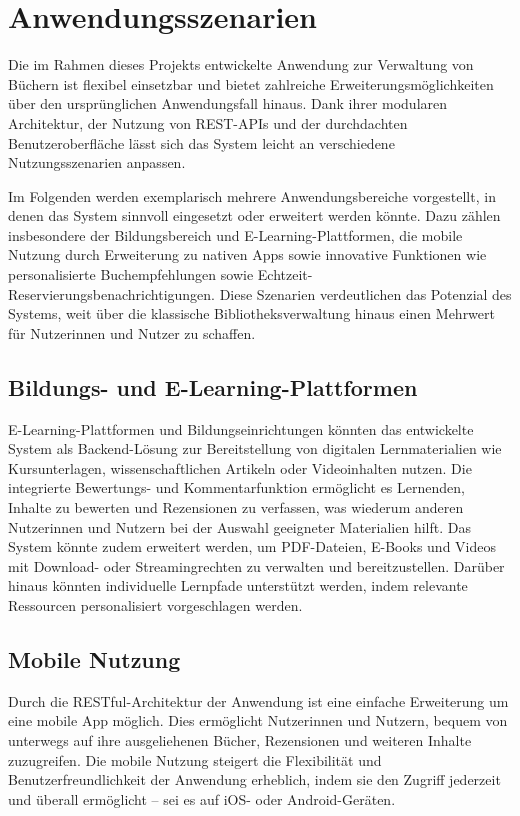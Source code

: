 \chapter{Anwendungsszenarien}

Die im Rahmen dieses Projekts entwickelte Anwendung zur Verwaltung von Büchern ist flexibel einsetzbar und bietet zahlreiche Erweiterungsmöglichkeiten über den ursprünglichen Anwendungsfall hinaus. Dank ihrer modularen Architektur, der Nutzung von REST-APIs und der durchdachten Benutzeroberfläche lässt sich das System leicht an verschiedene Nutzungsszenarien anpassen.

\noindent Im Folgenden werden exemplarisch mehrere Anwendungsbereiche vorgestellt, in denen das System sinnvoll eingesetzt oder erweitert werden könnte. Dazu zählen insbesondere der Bildungsbereich und E-Learning-Plattformen, die mobile Nutzung durch Erweiterung zu nativen Apps sowie innovative Funktionen wie personalisierte Buchempfehlungen sowie Echtzeit-Reservierungsbenachrichtigungen. Diese Szenarien verdeutlichen das Potenzial des Systems, weit über die klassische Bibliotheksverwaltung hinaus einen Mehrwert für Nutzerinnen und Nutzer zu schaffen.

\section{Bildungs- und E-Learning-Plattformen}

E-Learning-Plattformen und Bildungseinrichtungen könnten das entwickelte System als Backend-Lösung zur Bereitstellung von digitalen Lernmaterialien wie Kursunterlagen, wissenschaftlichen Artikeln oder Videoinhalten nutzen. Die integrierte Bewertungs- und Kommentarfunktion ermöglicht es Lernenden, Inhalte zu bewerten und Rezensionen zu verfassen, was wiederum anderen Nutzerinnen und Nutzern bei der Auswahl geeigneter Materialien hilft. Das System könnte zudem erweitert werden, um PDF-Dateien, E-Books und Videos mit Download- oder Streamingrechten zu verwalten und bereitzustellen. Darüber hinaus könnten individuelle Lernpfade unterstützt werden, indem relevante Ressourcen personalisiert vorgeschlagen werden.

\section{Mobile Nutzung}

Durch die RESTful-Architektur der Anwendung ist eine einfache Erweiterung um eine mobile App möglich. Dies ermöglicht Nutzerinnen und Nutzern, bequem von unterwegs auf ihre ausgeliehenen Bücher, Rezensionen und weiteren Inhalte zuzugreifen. Die mobile Nutzung steigert die Flexibilität und Benutzerfreundlichkeit der Anwendung erheblich, indem sie den Zugriff jederzeit und überall ermöglicht – sei es auf iOS- oder Android-Geräten.


